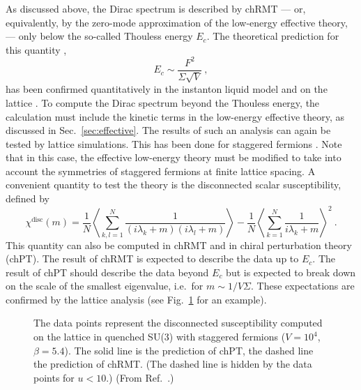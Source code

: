 As discussed above, the Dirac spectrum is described by chRMT
--- or, equivalently, by the zero-mode approximation of the low-energy
effective theory, --- only below the so-called Thouless energy $E_c$.  The
theoretical prediction for this quantity \cite{Verb96,Trento},
\begin{equation}
  E_c\sim\frac{F^2}{\Sigma\sqrt{V}}\:,
\end{equation}
has been confirmed quantitatively in the instanton liquid model
\cite{Osbo98a,Garc00} and on the lattice \cite{Berb98c,Gock98,Guhr99}.
To 
compute the Dirac spectrum beyond the Thouless energy, the calculation
must include the kinetic
terms in the low-energy effective theory, as discussed in
Sec.~\ref{sec:effective}.  The results of 
such an analysis can again be tested by lattice simulations.  This has
been done for staggered fermions \cite{Berb99}.  Note that in this
case, the effective low-energy theory must be modified to take into
account the
symmetries of staggered fermions at finite lattice spacing.
A convenient quantity to test the theory
is the disconnected scalar susceptibility, defined by
\begin{equation}
  \chi^{\mathrm {disc}}(m)
    =\frac{1}{N}\left\langle\sum_{k,l=1}^N \frac{1}
      {(i\lambda_k+m)(i\lambda_l+m)}\right\rangle
     -\frac{1}{N} \left\langle\sum_{k=1}^N\frac{1}
      {i\lambda_k+m}\right\rangle^2 \:.
\end{equation}
This quantity can also be computed in chRMT and in chiral perturbation
theory (chPT).  The result
of chRMT is expected to describe the data up to $E_c$.  The result of
chPT should describe the data beyond $E_c$ but is expected to break
down on the scale of the smallest eigenvalue, i.e.\ for $m\sim
1/V\Sigma$.  These expectations are confirmed by the lattice analysis
(see Fig.~\ref{chPT} for an example).

\begin{figure}
  \begin{center}
    \caption{The data points represent the disconnected susceptibility
      computed on the lattice in quenched SU(3) with staggered
      fermions ($V=10^4$, $\beta=5.4$).  The solid line is the
      prediction of chPT, the dashed line the prediction of chRMT.
      (The dashed line is hidden by the data points for
      $u<10$.)  (From Ref.~\cite{Berb99}.)}
    \label{chPT}
  \end{center}
\end{figure}

 


